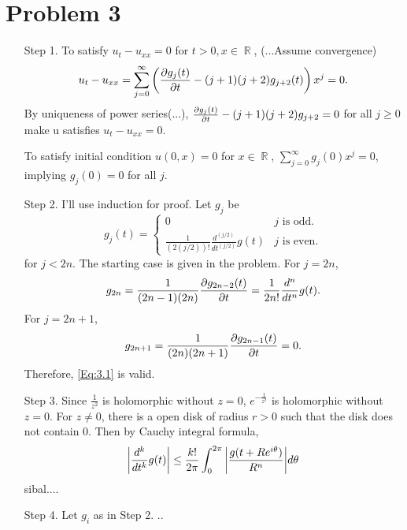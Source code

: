 \documentclass{article}
\DeclareMathOperator{\rr}{\mathbb{R}}
\begin{document}
\section*{Problem 3}
\begin{enumerate}
\item[Step 1.] To satisfy $u_t-u_{xx}=0$ for $t>0, x\in \rr$, (...Assume convergence) 
\begin{equation*}
u_t-u_{xx}=\sum_{j=0}^\infty \left(\pdv{g_j(t)}{t}-(j+1)(j+2)g_{j+2}(t)\right)x^{j}=0.
\end{equation*}
By uniqueness of power series(...), $\pdv{g_j(t)}{t}-(j+1)(j+2)g_{j+2}=0$ for all $j\geq 0$ make u satisfies $u_t-u_{xx}=0$.

To satisfy initial condition $u(0, x)=0$ for $x\in \rr$, $\sum_{j=0}^\infty g_j(0)x^j=0$, implying $g_j(0)=0$ for all $j$.

\item[Step 2.] I'll use induction for proof. Let $g_j$ be
\begin{equation}\label{Eq:3.1}
g_j(t)=\begin{cases}
0 & j\text{ is odd.} \\
\frac{1}{(2(j/2))!}\frac{d^{(j/2)}}{dt^{(j/2)}}g(t) & j\text{ is even.}
\end{cases}
\end{equation}
for $j<2n$. The starting case is given in the problem. For $j=2n$,
\begin{equation*}
g_{2n}=\frac{1}{(2n-1)(2n)}\pdv{g_{2n-2}(t)}{t}=\frac{1}{2n!}\frac{d^{n}}{dt^{n}}g(t).
\end{equation*}
For $j=2n+1$,
\begin{equation*}
g_{2n+1}=\frac{1}{(2n)(2n+1)}\pdv{g_{2n-1}(t)}{t}=0.
\end{equation*}
Therefore, \eqref{Eq:3.1} is valid.
\item[Step 3.] Since $\frac{1}{z^2}$ is holomorphic without $z= 0$, $e^{-\frac{1}{z^2}}$ is holomorphic without $z=0$. For $z\neq 0$, there is a open disk of radius $r>0$ such that the disk does not contain $0$. Then by Cauchy integral formula,
\begin{equation*}
\abs{\frac{d^k}{dt^k}g(t)}\leq \frac{k!}{2\pi}\int_0^{2\pi} \abs{\frac{g(t+Re^{i\theta})}{R^{n}}}d\theta
\end{equation*}
sibal....

\item[Step 4.] Let $g_i$ as in Step 2. ..
\end{enumerate}
\end{document}

